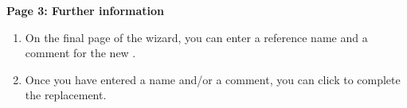 
\textbf{Page 3: Further information}
\begin{enumerate}
\item On the final page of the wizard, you can enter a \gdcase{} reference name and a comment for the new \gdcase{}. 
\item Once you have entered a name and/or a comment, you can click  to complete the replacement.
\end{enumerate}
